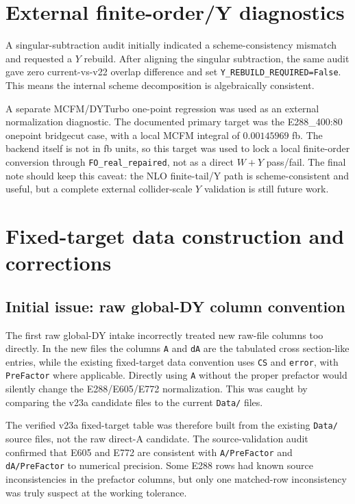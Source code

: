 \documentclass[11pt]{article}
\newcommand{\code}[1]{\texttt{#1}}
\begin{document}
\section{External finite-order/Y diagnostics}

A singular-subtraction audit initially indicated a scheme-consistency mismatch and requested a $Y$ rebuild.  After aligning the singular subtraction, the same audit gave zero current-vs-v22 overlap difference and set \code{Y\_REBUILD\_REQUIRED=False}.  This means the internal scheme decomposition is algebraically consistent.

A separate MCFM/DYTurbo one-point regression was used as an external normalization diagnostic.  The documented primary target was the E288\_400:80 onepoint bridgecut case, with a local MCFM integral of $0.00145969$ fb.  The backend itself is not in fb units, so this target was used to lock a local finite-order conversion through \code{FO\_real\_repaired}, not as a direct $W+Y$ pass/fail.  The final note should keep this caveat: the NLO finite-tail/Y path is scheme-consistent and useful, but a complete external collider-scale $Y$ validation is still future work.

\section{Fixed-target data construction and corrections}
\label{sec:data}

\subsection{Initial issue: raw global-DY column convention}

The first raw global-DY intake incorrectly treated new raw-file columns too directly.  In the new files the columns \code{A} and \code{dA} are the tabulated cross section-like entries, while the existing fixed-target data convention uses \code{CS} and \code{error}, with \code{PreFactor} where applicable.  Directly using \code{A} without the proper prefactor would silently change the E288/E605/E772 normalization.  This was caught by comparing the v23a candidate files to the current \code{Data/} files.

The verified v23a fixed-target table was therefore built from the existing \code{Data/} source files, not the raw direct-A candidate.  The source-validation audit confirmed that E605 and E772 are consistent with \code{A/PreFactor} and \code{dA/PreFactor} to numerical precision.  Some E288 rows had known source inconsistencies in the prefactor columns, but only one matched-row inconsistency was truly suspect at the working tolerance.
\end{document}
